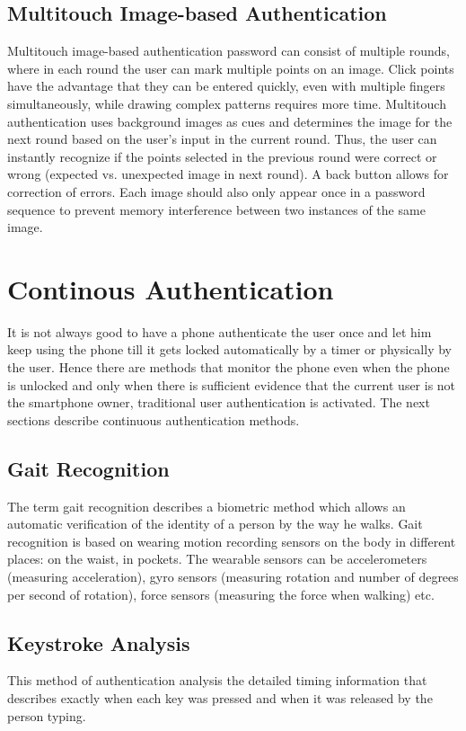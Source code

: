 \subsection{Multitouch Image-based Authentication}
Multitouch image-based authentication password can consist of multiple rounds, where in each round the user can mark multiple points on an image. Click points have the advantage that they can be entered quickly,  even with multiple fingers simultaneously, while drawing complex patterns requires more time. Multitouch authentication uses background images as cues and determines the image for the next round based on the user's input in the current round. Thus, the user can instantly recognize if the points selected in the previous round were correct or wrong (expected vs. unexpected image in next round). A back button allows for correction of errors. Each image should also only appear once in a password sequence to prevent memory interference between two instances of the same image. \cite{ritter2013miba}

\section{Continous Authentication}
It is not always good to have a phone authenticate the user once and let him keep using the phone till it gets locked automatically by a timer or physically by the user. Hence there are methods that monitor the phone even when the phone is unlocked and only when there is sufficient evidence that the current user is not the smartphone owner, traditional user authentication is activated. The next sections describe continuous authentication methods.

\subsection{Gait Recognition}
The term gait recognition describes a biometric method
which allows an automatic verification of the identity of a person by the way he walks. Gait recognition is based on wearing motion recording sensors on the body in different places: on the waist, in pockets. The wearable sensors can be accelerometers (measuring acceleration), gyro sensors (measuring rotation and number of degrees per second of rotation), force sensors (measuring the force when walking) etc. \cite{derawi2010unobtrusive, srirama2012social}

\subsection{Keystroke Analysis}
This method of authentication analysis the detailed timing information that describes exactly when each key was pressed and when it was released by the person typing. \cite{buchoux2008deployment}

